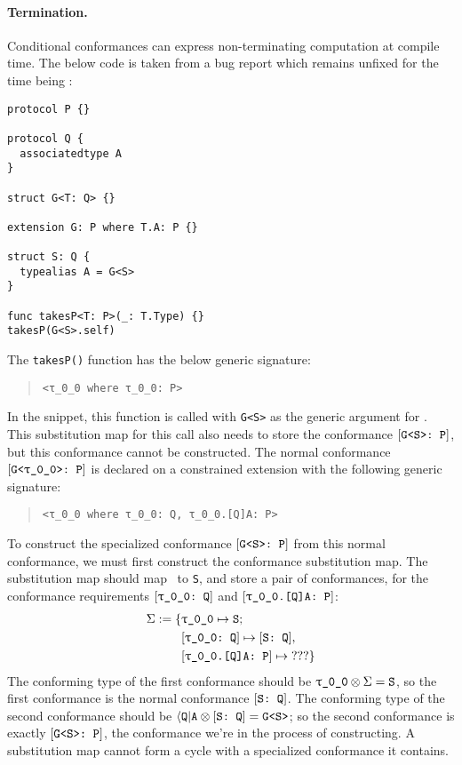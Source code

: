 \documentclass[../generics]{subfiles}
\begin{document}
\paragraph{Termination.}
Conditional conformances can express non-terminating computation at compile time. 
The below code is taken from a bug report which remains unfixed for the time being \cite{sr6724}:
\begin{Verbatim}
protocol P {}

protocol Q {
  associatedtype A
}

struct G<T: Q> {}

extension G: P where T.A: P {}

struct S: Q {
  typealias A = G<S>
}

func takesP<T: P>(_: T.Type) {}
takesP(G<S>.self)
\end{Verbatim}
The \texttt{takesP()} function has the below generic signature:
\begin{quote}
\begin{verbatim}
<τ_0_0 where τ_0_0: P>
\end{verbatim}
\end{quote}
In the snippet, this function is called with \texttt{G<S>} as the generic argument for \rT. This substitution map for this call also needs to store the conformance $[\texttt{G<S>:~P}]$, but this conformance cannot be constructed. The normal conformance $\ConfReq{G<\rT>}{P}$ is declared on a constrained extension with the following generic signature:
\begin{quote}
\begin{verbatim}
<τ_0_0 where τ_0_0: Q, τ_0_0.[Q]A: P>
\end{verbatim}
\end{quote}
To construct the specialized conformance $[\texttt{G<S>:~P}]$ from this normal conformance, we must first construct the conformance substitution map. The substitution map should map \rT\ to \texttt{S}, and store a pair of conformances, for the conformance requirements $\ConfReq{\rT}{Q}$ and $\ConfReq{\rT.[Q]A}{P}$:
\begin{align*}
\Sigma := \SubstMapC{
&\SubstType{\rT}{S}}{
\\
&\SubstConf{\rT}{S}{Q},\\
&\ConfReq{\rT.[Q]A}{P}\mapsto\text{???}
}
\end{align*}
The conforming type of the first conformance should be $\rT\otimes\Sigma=\texttt{S}$, so the first conformance is the normal conformance $[\texttt{S:~Q}]$. The conforming type of the second conformance should be 
$\langle\texttt{Q}|\texttt{A}\otimes[\texttt{S:~Q}]=\texttt{G<S>}$; so the second conformance is exactly $[\texttt{G<S>:~P}]$, the conformance we're in the process of constructing. A substitution map cannot form a cycle with a specialized conformance it contains.
\end{document}
